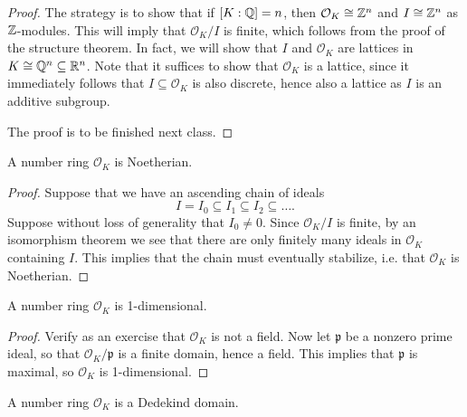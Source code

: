 \begin{proof}
  The strategy is to show that if $[K : \mathbb{Q}] = n$, then
  $\mathcal{O}_K \cong \mathbb{Z}^n$ and $I \cong \mathbb{Z}^n$
  as $\mathbb{Z}$-modules. This will imply that
  $\mathcal{O}_K / I$ is finite, which follows from
  the proof of the structure theorem. In fact, we will
  show that $I$ and $\mathcal{O}_K$
  are lattices in $K \cong \mathbb{Q}^n \subseteq \mathbb{R}^n$.
  Note
  that it suffices to show that $\mathcal{O}_K$ is
  a lattice, since it immediately follows that
  $I \subseteq \mathcal{O}_K$ is also discrete, hence
  also a lattice as $I$ is an additive subgroup.

  The proof is to be finished next class.
\end{proof}

\begin{corollary}
  A number ring $\mathcal{O}_K$ is Noetherian.
\end{corollary}

\begin{proof}
  Suppose that we have an ascending chain of ideals
  \[
    I = I_0 \subseteq I_1 \subseteq I_2 \subseteq \dots.
  \]
  Suppose without loss of generality that $I_0 \ne 0$.
  Since $\mathcal{O}_K / I$ is finite, by an isomorphism
  theorem we see that there are only finitely many ideals
  in $\mathcal{O}_K$ containing $I$. This implies that
  the chain must eventually stabilize, i.e. that
  $\mathcal{O}_K$ is Noetherian.
\end{proof}

\begin{corollary}
  A number ring $\mathcal{O}_K$ is 1-dimensional.
\end{corollary}

\begin{proof}
  Verify as an exercise that $\mathcal{O}_K$ is not
  a field.
  Now let $\mathfrak{p}$ be a nonzero prime ideal,
  so that
  $\mathcal{O}_K / \mathfrak{p}$ is a finite domain,
  hence a field. This implies that $\mathfrak{p}$ is
  maximal, so $\mathcal{O}_K$ is 1-dimensional.
\end{proof}

\begin{theorem}
  A number ring $\mathcal{O}_K$ is a Dedekind domain.
\end{theorem}
